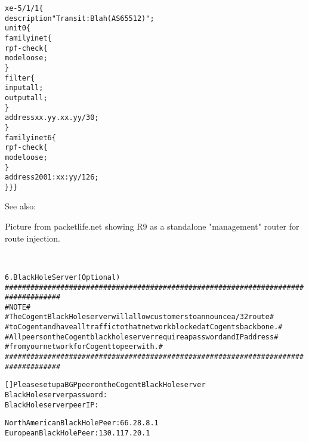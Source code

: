 \documentclass[Screen16to9,17pt]{foils}
\begin{document}







\begin{alltt}\footnotesize
xe-5/1/1 \{
    description "Transit: Blah (AS65512)";
    unit 0 \{
        family inet \{
            rpf-check \{
                mode loose;
            \}
            filter \{
                input all;
                output all;
            \}
            address xx.yy.xx.yy/30;
        \}
        family inet6 \{
            rpf-check \{
                mode loose;
            \}
            address 2001:xx:yy/126;
\} \} \}
\end{alltt}

See also: {\small{}}



Picture from packetlife.net showing  R9 as a standalone "management" router for route injection.

{\footnotesize
{}\\
}



\begin{alltt}\footnotesize
6.  Black Hole Server (Optional)
   ###################################################################################
   #                           NOTE                                                  #
   #  The Cogent Black Hole server will allow customers to announce a /32 route      #
   #  to Cogent and have all traffic to that network blocked at Cogents backbone.    #
   #  All peers on the Cogent black hole server require a password and IP address    #
   #  from your network for Cogent to peer with.                                     #
   ###################################################################################

       [   ]  Please set up a BGP peer on the Cogent Black Hole server
       Black Hole server password:
       Black Hole server peer IP:

       North American Black Hole Peer:  66.28.8.1
       European Black Hole Peer:  130.117.20.1
\end{alltt}
\end{document}
